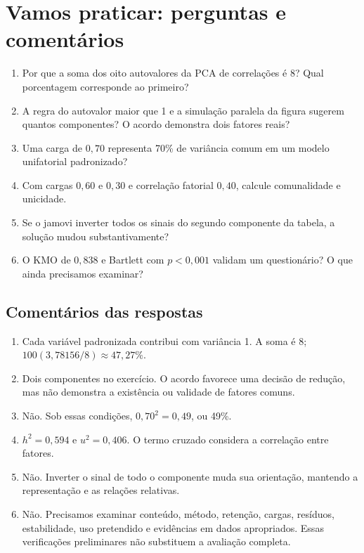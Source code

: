 \section{Vamos praticar: perguntas e comentários}

\begin{enumerate}
  \item Por que a soma dos oito autovalores da PCA de correlações é 8? Qual porcentagem corresponde ao primeiro?
  \item A regra do autovalor maior que 1 e a simulação paralela da figura sugerem quantos componentes? O acordo demonstra dois fatores reais?
  \item Uma carga de $0{,}70$ representa 70\% de variância comum em um modelo unifatorial padronizado?
  \item Com cargas $0{,}60$ e $0{,}30$ e correlação fatorial $0{,}40$, calcule comunalidade e unicidade.
  \item Se o jamovi inverter todos os sinais do segundo componente da tabela, a solução mudou substantivamente?
  \item O KMO de $0{,}838$ e Bartlett com $p<0{,}001$ validam um questionário? O que ainda precisamos examinar?
\end{enumerate}

\subsection*{Comentários das respostas}

\begin{enumerate}
  \item Cada variável padronizada contribui com variância 1. A soma é 8; $100(3{,}78156/8)\approx47{,}27\%$.
  \item Dois componentes no exercício. O acordo favorece uma decisão de redução, mas não demonstra a existência ou validade de fatores comuns.
  \item Não. Sob essas condições, $0{,}70^2=0{,}49$, ou 49\%.
  \item $h^2=0{,}594$ e $u^2=0{,}406$. O termo cruzado considera a correlação entre fatores.
  \item Não. Inverter o sinal de todo o componente muda sua orientação, mantendo a representação e as relações relativas.
  \item Não. Precisamos examinar conteúdo, método, retenção, cargas, resíduos, estabilidade, uso pretendido e evidências em dados apropriados. Essas verificações preliminares não substituem a avaliação completa.
\end{enumerate}


